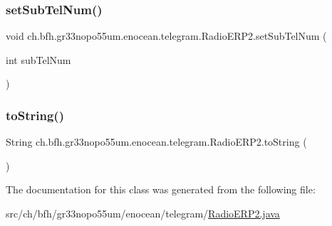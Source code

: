 \subsubsection{\texorpdfstring{set\+Sub\+Tel\+Num()}{setSubTelNum()}}
{\footnotesize\ttfamily void ch.\+bfh.\+gr33nopo55um.\+enocean.\+telegram.\+Radio\+E\+R\+P2.\+set\+Sub\+Tel\+Num (\begin{DoxyParamCaption}\item[{int}]{sub\+Tel\+Num }\end{DoxyParamCaption})}

\hypertarget{classch_1_1bfh_1_1gr33nopo55um_1_1enocean_1_1telegram_1_1_radio_e_r_p2_ab5c597ab293469283683dc457bcea2c1}{}\label{classch_1_1bfh_1_1gr33nopo55um_1_1enocean_1_1telegram_1_1_radio_e_r_p2_ab5c597ab293469283683dc457bcea2c1} 
\subsubsection{\texorpdfstring{to\+String()}{toString()}}
{\footnotesize\ttfamily String ch.\+bfh.\+gr33nopo55um.\+enocean.\+telegram.\+Radio\+E\+R\+P2.\+to\+String (\begin{DoxyParamCaption}{ }\end{DoxyParamCaption})}



The documentation for this class was generated from the following file\+:\begin{DoxyCompactItemize}
\item 
src/ch/bfh/gr33nopo55um/enocean/telegram/\hyperlink{_radio_e_r_p2_8java}{Radio\+E\+R\+P2.\+java}\end{DoxyCompactItemize}
